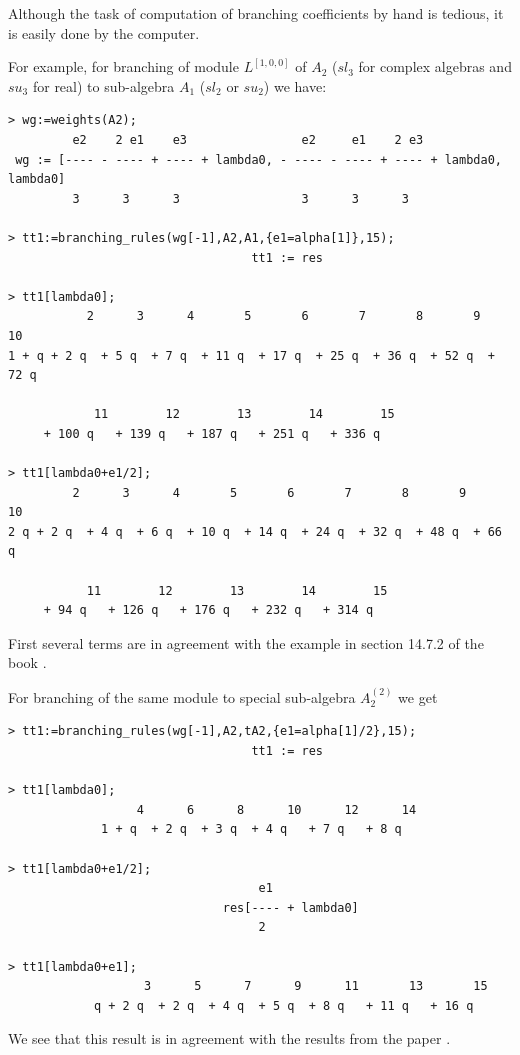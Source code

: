 \documentclass[a4paper,12pt]{article}
\theoremstyle{definition} \newtheorem{Def}{Definition}
\begin{document}
Although the task of computation of branching coefficients by hand is
tedious, it is easily done by the computer.

For example, for branching of module $L^{[1,0,0]}$ of $A_2$ ($sl_3$
for complex algebras and $su_3$ for real) to sub-algebra $A_1$ ($sl_2$
or $su_2$) we have:
\begin{verbatim}
> wg:=weights(A2);
         e2    2 e1    e3                e2     e1    2 e3
 wg := [---- - ---- + ---- + lambda0, - ---- - ---- + ---- + lambda0, lambda0]
         3      3      3                 3      3      3

> tt1:=branching_rules(wg[-1],A2,A1,{e1=alpha[1]},15);
                                  tt1 := res

> tt1[lambda0];
           2      3      4       5       6       7       8       9       10
1 + q + 2 q  + 5 q  + 7 q  + 11 q  + 17 q  + 25 q  + 36 q  + 52 q  + 72 q

            11        12        13        14        15
     + 100 q   + 139 q   + 187 q   + 251 q   + 336 q  

> tt1[lambda0+e1/2];
         2      3      4       5       6       7       8       9       10
2 q + 2 q  + 4 q  + 6 q  + 10 q  + 14 q  + 24 q  + 32 q  + 48 q  + 66 q

           11        12        13        14        15
     + 94 q   + 126 q   + 176 q   + 232 q   + 314 q  
\end{verbatim}
First several terms are in agreement with the example in section
14.7.2 of the book \cite{difrancesco1997cft}.

For branching of the same module to special sub-algebra $A_2^{(2)}$ we
get
\begin{verbatim}
> tt1:=branching_rules(wg[-1],A2,tA2,{e1=alpha[1]/2},15);
                                  tt1 := res

> tt1[lambda0];
                  4      6      8      10      12      14
             1 + q  + 2 q  + 3 q  + 4 q   + 7 q   + 8 q

> tt1[lambda0+e1/2];
                                   e1
                              res[---- + lambda0]
                                   2

> tt1[lambda0+e1];
                   3      5      7      9      11       13       15
            q + 2 q  + 2 q  + 4 q  + 5 q  + 8 q   + 11 q   + 16 q
\end{verbatim}
We see that this result is in agreement with the results from the paper \cite{ilyin812pbc}.
\end{document}
